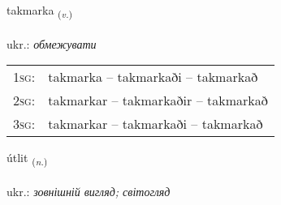 \documentclass[frontgrid, backgrid]{flacards}\usepackage[]{graphicx}\usepackage[]{xcolor}
\begin{document}
\renewcommand{\flhead}{\vskip5pt \fboxsep=0pt {\small\bfseries\footnotesize Sagnorð | дієслово}}
\renewcommand{\fcfoot}{\vskip5pt \fboxsep=0pt \hspace{2pt}{\small\bfseries\footnotesize 2K}}

\renewcommand{\blhead}{\vskip5pt {\small\bfseries\footnotesize Sagnorð | дієслово }}
\renewcommand{\bcfoot}{\vskip5pt \hspace{2pt}{\small\bfseries\footnotesize 2K}}


{takmarka \small{\textsubscript{(\textit{v.})}} \\[1ex] %
\textphonetic{[tʰakmar̥ka]} \\
ukr.: \emph{обмежувати} \\  [2ex]
\renewcommand*{\arraystretch}{0.8}
\begin{tabular}{p{1cm}l}
\textsc{1sg}: & takmarka -- takmarkaði -- takmarkað \\ 
\textsc{2sg}: & takmarkar -- takmarkaðir -- takmarkað \\ 
\textsc{3sg}: & takmarkar -- takmarkaði -- takmarkað \\ 
\end{tabular}
}

\renewcommand{\flhead}{\vskip5pt \fboxsep=0pt {\small\bfseries\footnotesize Nafnorð | іменник}}
\renewcommand{\fcfoot}{\vskip5pt \fboxsep=0pt \hspace{2pt}{\small\bfseries\footnotesize 2K}}

\renewcommand{\blhead}{\vskip5pt {\small\bfseries\footnotesize Nafnorð | іменник }}
\renewcommand{\bcfoot}{\vskip5pt \hspace{2pt}{\small\bfseries\footnotesize 2K}}


{útlit \small{\textsubscript{(\textit{n.})}} \\[1ex] %
\textphonetic{[uːtlɪt]} \\
ukr.: \emph{зовнішній вигляд; світогляд} \\  [2ex]
\renewcommand*{\arraystretch}{0.8}
}
\end{document}
